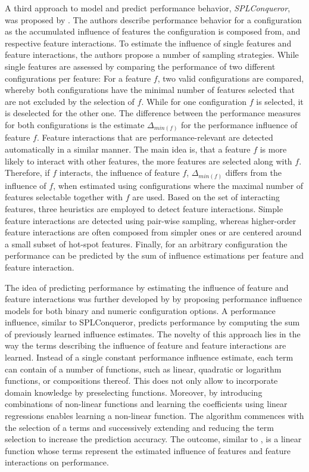 A third approach to model and predict performance behavior,
\emph{SPLConqueror}, was proposed by \cite{siegmund_predicting_2012}. The
authors describe performance behavior  for a configuration as the accumulated influence of
features the configuration is composed from, and respective feature
interactions. To estimate the influence of single features and feature
interactions, the authors propose a number of sampling strategies. While single
features are assessed by comparing the performance of two different
configurations per feature: For a feature $f$, two valid configurations are
compared, whereby both configurations have the minimal number of features
selected that are not excluded by the selection of $f$. While for one
configuration $f$ is selected, it is deselected for the other one. The
difference between the performance measures for both configurations is the estimate
$\Delta_{min(f)}$ for the performance influence of feature $f$. Feature
interactions that are performance-relevant are detected automatically in a similar manner. The
main idea is, that a feature $f$ is more likely to interact with other features,
the more features are selected along with $f$. Therefore, if $f$ interacts, the
influence of feature $f$,  $\Delta_{min(f)}$ differs from the influence of $f$,
when estimated using configurations where the maximal number of features selectable
together with $f$ are used. Based on the set of interacting features, three
heuristics are employed to detect feature interactions. Simple feature
interactions are detected using pair-wise sampling, whereas higher-order
feature interactions are often composed from simpler ones or are centered
around a small subset of hot-spot features. Finally, for an arbitrary
configuration the performance can be predicted by the sum of influence
estimations per feature and feature interaction.

The idea of predicting performance by estimating the influence of feature
and feature interactions was further developed by \cite{siegmund_performance-influence_2015} by
proposing performance influence models for both binary and numeric
configuration options. A performance influence, similar to SPLConqueror,
predicts performance by computing the sum of previously learned influence
estimates. The novelty of this approach lies in the way the terms describing
the influence of feature and feature interactions are learned. Instead of a
single constant performance influence estimate, each term can contain of a
number of functions, such as linear, quadratic or logarithm functions, or
compositions thereof. This does not only allow to incorporate domain knowledge
by preselecting functions. Moreover, by introducing combinations of non-linear
functions and learning the coefficients using linear regressions enables
learning a non-linear function. The algorithm commences with the selection of a
terms and successively extending and reducing the term selection to increase 
the prediction accuracy. The outcome, similar to
\cite{siegmund_predicting_2012}, is a linear function whose terms represent the estimated influence of features and
feature interactions on performance.

